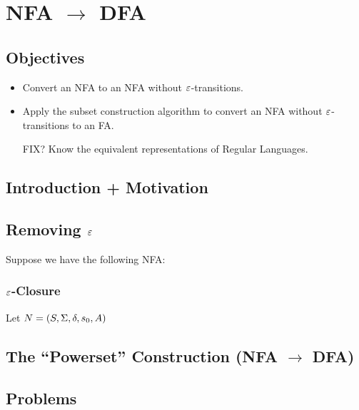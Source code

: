 \chapter{NFA $\to$ DFA}

\section{Objectives}

\begin{itemize}
	\item Convert an NFA to an NFA without $\varepsilon$-transitions.
	\item Apply the subset construction algorithm to convert an NFA without $\varepsilon$-transitions to an FA.
	\item [FIX?] Know the equivalent representations of Regular Languages.
\end{itemize}

\section{Introduction + Motivation}

\section{Removing $\varepsilon$}

Suppose we have the following NFA:


\subsection{$\varepsilon$-Closure}

\begin{definition}
	Let $N = (S, \Sigma, \delta, s_0, A)$
\end{definition}

\section{The ``Powerset'' Construction (NFA $\to$ DFA)}



\section{Problems}